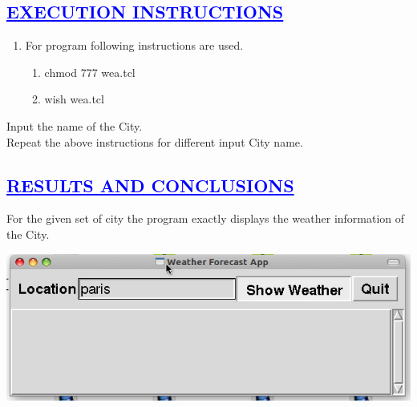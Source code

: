 \documentclass[a4paper,12pt]{report}
\begin{document}
\begin{center}
\chapter{\textcolor{blue}{\underline {EXECUTION INSTRUCTIONS}}}
\end{center}
\begin{enumerate}
 \item For program following instructions are used.
 \begin{enumerate}
  \item chmod 777 wea.tcl
  \item wish wea.tcl
 \end{enumerate}

\end{enumerate}
Input the  name of the City.\\
Repeat the above instructions for different input City name.
\begin{center}
\chapter{\textcolor{blue}{\underline {RESULTS AND CONCLUSIONS}}}\end{center}
\noindent For the given set of city the program exactly displays the weather information of the City.\\
\begin{center}
 \includegraphics[width=13 cm,height=8 cm]{./Screenshot-1.png}
 
\end{center}
\end{document}
